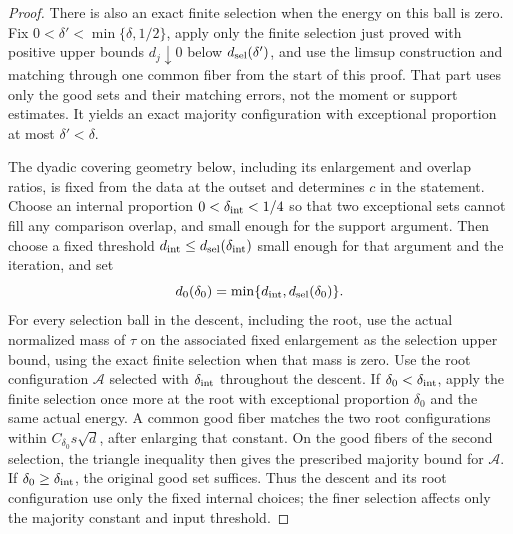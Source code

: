 \begin{proof}
There is also an exact finite selection when the energy on this ball is
zero.  Fix $0<\delta'<\min\{\delta,1/2\}$, apply only the finite selection
just proved with positive upper bounds $d_j\downarrow0$ below
$d_{\rm sel}(\delta')$, and use the limsup construction and matching through
one common fiber from the start of this proof.  That part uses only the good sets and their
matching errors, not the moment or support estimates.  It yields an exact
majority configuration with exceptional proportion at most $\delta'<\delta$.

The dyadic covering geometry below, including its enlargement and overlap
ratios, is fixed from the data at the outset and determines $c$ in the
statement.  Choose an internal proportion $0<\delta_{\rm int}<1/4$ so that
two exceptional sets cannot fill any comparison overlap, and small enough
for the support argument.  Then choose a fixed threshold
$d_{\rm int}\le d_{\rm sel}(\delta_{\rm int})$ small enough for that argument
and the iteration, and set
\[
 d_0(\delta_0)=\min\{d_{\rm int},d_{\rm sel}(\delta_0)\}.
\]
For every selection ball in the descent, including the root, use the actual
normalized mass of $\tau$ on the associated fixed enlargement as the selection
upper bound, using the exact finite selection when that mass is zero.
Use the root configuration $\mathcal A$ selected with
$\delta_{\rm int}$ throughout the descent.  If $\delta_0<\delta_{\rm int}$,
apply the finite selection once more at the root with exceptional proportion
$\delta_0$ and the same actual energy.  A common good fiber matches the two
root configurations within
$C_{\delta_0}s\sqrt d$, after enlarging that constant.  On the good fibers
of the second selection, the triangle inequality then gives the prescribed
majority bound for $\mathcal A$.  If $\delta_0\ge\delta_{\rm int}$, the
original good set suffices.  Thus the descent and its root configuration
use only the fixed internal choices; the finer selection affects only the
majority constant and input threshold.


\end{proof}

